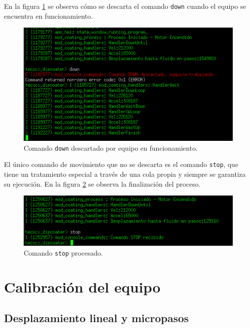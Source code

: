 En la figura \ref{fig:consola_comando_ok} se observa cómo se descarta el comando \texttt{down} cuando el equipo se encuentra en funcionamiento.

\begin{figure}[h!]
	\centering
	\includegraphics[width=1\textwidth]{./Figures/consola_4.png}
	\caption{Comando \texttt{down} descartado por equipo en funcionamiento.}
	\label{fig:consola_comando_ok}
\end{figure}

El único comando de movimiento que no se descarta es el comando \texttt{stop}, que tiene un tratamiento especial a través de una cola propia y siempre se garantiza su ejecución. En la figura \ref{fig:consola_comando_false} se observa la finalización del proceso.

\begin{figure}[h!]
	\centering
	\includegraphics[width=1\textwidth]{./Figures/consola_5.png}
	\caption{Comando \texttt{stop} procesado.}
	\label{fig:consola_comando_false}
\end{figure}
 
  
\section{Calibración del equipo}
\label{sec:calibración}
\subsection{Desplazamiento lineal y micropasos}

